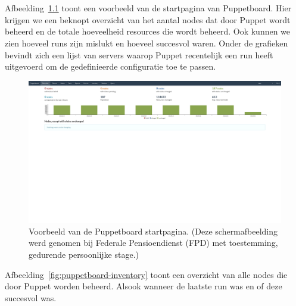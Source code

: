 
\chapter{}%
\label{ch:bijlage_puppetboard}

Afbeelding~\ref{fig:puppetboard-home} toont een voorbeeld van de startpagina van Puppetboard.
Hier krijgen we een beknopt overzicht van het aantal nodes dat door Puppet wordt beheerd en de totale hoeveelheid resources die wordt beheerd.
Ook kunnen we zien hoeveel runs zijn mislukt en hoeveel succesvol waren.
Onder de grafieken bevindt zich een lijst van servers waarop Puppet recentelijk een run heeft uitgevoerd om de gedefinieerde configuratie toe te passen.

\begin{figure}[h!]
    \includegraphics[width=\textwidth]
    {./graphics/state-of-the-art/puppetboard/puppetboard-home.png}
    \caption[Puppetboard startpagina.]{\label{fig:puppetboard-home}Voorbeeld van de Puppetboard startpagina. (Deze schermafbeelding werd genomen bij Federale Pensioendienst (FPD) met toestemming, gedurende persoonlijke stage.)}
\end{figure}

Afbeelding~\ref{fig:puppetboard-inventory} toont een overzicht van alle nodes die door Puppet worden beheerd.
Alsook wanneer de laatste run was en of deze succesvol was.

